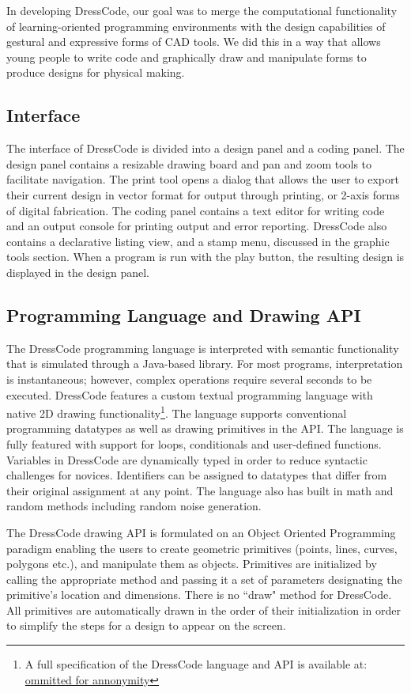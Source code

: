 \documentclass{sigchi}
\begin{document}
In developing DressCode, our goal was to merge the computational functionality of learning-oriented programming environments with the design capabilities of gestural and expressive forms of CAD tools. We did this in a way that allows young people to write code and graphically draw and manipulate forms to produce designs for physical making. 

\subsection{Interface}
The interface of DressCode is divided into a design panel and a coding panel. The design panel contains a resizable drawing board and pan and zoom tools to facilitate navigation. The print tool opens a dialog that allows the user to export their current design in vector format for output through printing, or 2-axis forms of digital fabrication. The coding panel contains a text editor for writing code and an output console for printing output and error reporting. DressCode also contains a declarative listing view, and a stamp menu, discussed in the graphic tools section. When a program is run with the play button, the resulting design is displayed in the design panel.

\subsection{Programming Language and Drawing API}
The DressCode programming language is interpreted with semantic functionality that is simulated through a Java-based library. For most programs, interpretation is instantaneous; however, complex operations require several seconds to be executed. DressCode features a custom textual programming language with native 2D drawing functionality\footnote{A full specification of the DressCode language and API is available at: \url{ommitted for annonymity}}. The language supports conventional programming datatypes as well as drawing primitives in the API. The language is fully featured with support for loops, conditionals and user-defined functions. Variables in DressCode are dynamically typed in order to reduce syntactic challenges for novices. Identifiers can be assigned to datatypes that differ from their original assignment at any point. The language also has built in math and random methods including random noise generation.

The DressCode drawing API is formulated on an Object Oriented Programming paradigm enabling the users to create geometric primitives (points, lines, curves, polygons etc.), and manipulate them as objects. Primitives are initialized by calling the appropriate method and passing it a set of parameters designating the primitive's location and dimensions. There is no ``draw" method for DressCode. All primitives are automatically drawn in the order of their initialization in order to simplify the steps for a design to appear on the screen.
 
\end{document}
